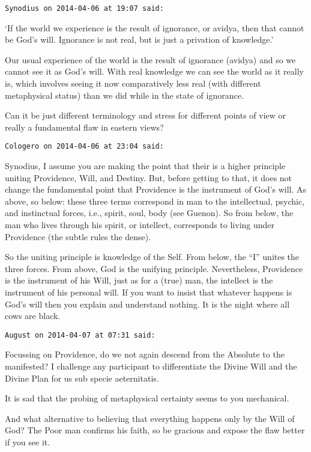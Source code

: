 \begin{footnotesize}
\begin{sffamily}
\texttt{Synodius on 2014-04-06 at 19:07 said: }

`If the world we experience is the result of ignorance, or avidya, then that cannot be God's will. Ignorance is not real, but is just a privation of knowledge.'

Our usual experience of the world is the result of ignorance (avidya) and so we cannot see it as God's will. With real knowledge we can see the world as it really is, which involves seeing it now comparatively less real (with different metaphysical status) than we did while in the state of ignorance. 

Can it be just different terminology and stress for different points of view or really a fundamental flaw in eastern views?


\hfill

\texttt{Cologero on 2014-04-06 at 23:04 said: }

Synodius, I assume you are making the point that their is a higher principle uniting Providence, Will, and Destiny. But, before getting to that, it does not change the fundamental point that Providence is the instrument of God's will. As above, so below: these three terms correspond in man to the intellectual, psychic, and instinctual forces, i.e., spirit, soul, body (see Guenon). So from below, the man who lives through his spirit, or intellect, corresponds to living under Providence (the subtle rules the dense).

So the uniting principle is knowledge of the Self. From below, the “I” unites the three forces. From above, God is the unifying principle. Nevertheless, Providence is the instrument of his Will, just as for a (true) man, the intellect is the instrument of his personal will. If you want to insist that whatever happens is God's will then you explain and understand nothing. It is the night where all cows are black.


\hfill

\texttt{August on 2014-04-07 at 07:31 said: }

Focussing on Providence, do we not again descend from the Absolute to the manifested? I challenge any participant to differentiate the Divine Will and the Divine Plan for us sub specie aeternitatis.

It is sad that the probing of metaphysical certainty seems to you mechanical.

And what alternative to believing that everything happens only by the Will of God? The Poor man confirms his faith, so be gracious and expose the flaw better if you see it.


\end{sffamily}
\end{footnotesize}
